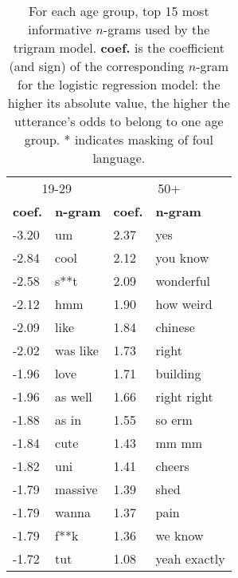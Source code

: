 \begin{table}[H]
    \centering
    \begin{tabular}{@{}l l @{\hspace*{25pt}} l l@{}}
    \toprule
    \multicolumn{2}{c}{19-29} & \multicolumn{2}{c}{50+}\\
    \textbf{coef.} & \textbf{n-gram} & \textbf{coef.} & \textbf{n-gram}\\
    \midrule
    -3.20 & um & 2.37 & yes\\
    -2.84 & cool & 2.12 & you know\\
    -2.58 & s**t & 2.09 & wonderful\\
    -2.12 & hmm & 1.90 & how weird\\
    -2.09 & like & 1.84 & chinese\\
    -2.02 & was like & 1.73 & right\\
    -1.96 & love & 1.71 & building\\
    -1.96 & as well & 1.66 & right right\\
    -1.88 & as in & 1.55 & so erm\\
    -1.84 & cute & 1.43 & mm mm\\
    -1.82 & uni & 1.41 & cheers\\
    -1.79 & massive & 1.39 & shed\\
    -1.79 & wanna & 1.37 & pain\\
    -1.79 & f**k & 1.36 & we know\\
    -1.72 & tut & 1.08 & yeah exactly\\
    \bottomrule
    \end{tabular}
    \vspace{3mm}
    \caption{
    For each age group, top 15 most informative $n$-grams used by the trigram model. \textbf{coef.} is the coefficient (and sign) of the corresponding $n$-gram for the logistic regression model: the higher its absolute value, the higher the utterance's odds to belong to one age group.
    * indicates masking of foul language.}
    \label{tab:top_ngrams_ws}
\end{table}

